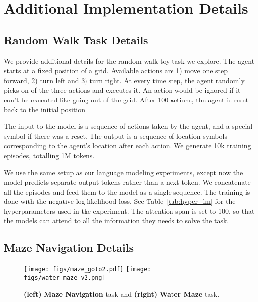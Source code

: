 \documentclass{article} \usepackage{iclr2021_conference}
\newcommand{\tab}[1]{Table~\ref{tab:#1}}
\begin{document}
\section{Additional Implementation Details}

\subsection{Random Walk Task Details}
We provide additional details for the random walk toy task we explore. 
The agent starts at a fixed position of a  grid.
Available actions are 1) move one step forward, 2) turn left and 3) turn right.
At every time step, the agent randomly picks on of the three actions and executes it. An action would be ignored if it can't be executed like going out of the grid. After 100 actions, the agent is reset back to the initial position.

The input to the model is a sequence of actions taken by the agent, and a special symbol if there was a reset. The output is a sequence of location symbols corresponding to the agent's location after each action. We generate 10k training episodes, totalling 1M tokens.

We use the same setup as our language modeling experiments, except now the model predicts separate output tokens rather than a next token.
We concatenate all the episodes and feed them to the model as a single sequence.
The training is done with the negative-log-likelihood loss. 
See \tab{hyper_lm} for the hyperparameters used in the experiment.
The attention span is set to 100, so that the models can attend to all the information they needs to solve the task. 



\subsection{Maze Navigation Details}
\label{sec:maze_detail}

\begin{figure*}
    \centering
    \texttt{[image: figs/maze\_goto2.pdf]}
    \hspace{1cm}
    \texttt{[image: figs/water\_maze\_v2.png]}
    \caption{\textbf{(left)} \textbf{Maze Navigation} task and \textbf{(right)}  \textbf{Water Maze} task.
 }
    \label{fig:maze_goto}
\end{figure*}
 
\end{document}
